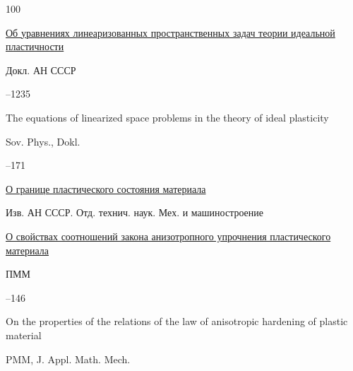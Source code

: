 \begin{thebibliography}{100}

\paper \href{https://zbmath.org/?q=an:0094.37602}{Об уравнениях линеаризованных пространственных задач теории идеальной пластичности}

\jour Докл. АН СССР




–1235


\transl


\paper The equations of linearized space problems in the theory of ideal plasticity

\jour Sov. Phys., Dokl. 


--171 





\paper \href{https://zbmath.org/?q=an:0126.20302}{О границе пластического состояния материала}

\jour Изв. АН СССР. Отд. технич. наук. Мех. и машиностроение








\paper \href{https://zbmath.org/?q=an:0096.18302}{О свойствах соотношений закона анизотропного упрочнения пластического материала}

\jour ПММ




–146


\transl


\paper On the properties of the relations of the law of anisotropic hardening of plastic material

\jour PMM, J. Appl. Math. Mech. 



\end{thebibliography}
